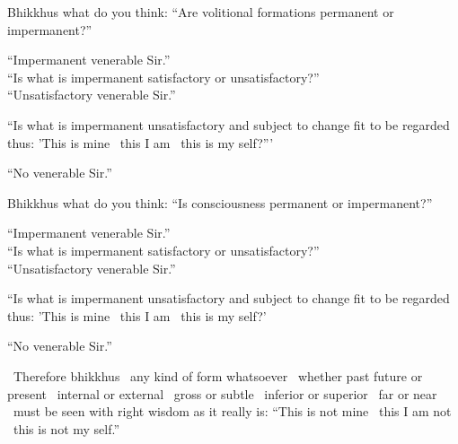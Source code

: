 \begin{english-only-nohang}
  \begin{english-only-hang}
    Bhikkhus what do you think: ``Are volitional formations permanent or impermanent?''
  \end{english-only-hang}

  ``Impermanent venerable Sir.''\\

  ``Is what is impermanent satisfactory or unsatisfactory?'' \\

  ``Unsatisfactory venerable Sir.''\\

  \begin{english-hangtogether}
    ``Is what is impermanent unsatisfactory and subject to change fit to be regarded thus: 'This is mine \breathmark\ this I am \breathmark\ this is my self?'''
  \end{english-hangtogether}

  ``No venerable Sir.''
\end{english-only-nohang}

\begin{english-only-nohang}
  \begin{english-only-hang}
    Bhikkhus what do you think: ``Is consciousness permanent or impermanent?''
  \end{english-only-hang}

  ``Impermanent venerable Sir.''\\

  ``Is what is impermanent satisfactory or unsatisfactory?''\\

  ``Unsatisfactory venerable Sir.''\\

  \begin{english-hangtogether}
    ``Is what is impermanent unsatisfactory and subject to change fit to be regarded thus: 'This is mine \breathmark\ this I am \breathmark\ this is my self?'
  \end{english-hangtogether}

  ``No venerable Sir.''
\end{english-only-nohang}

\begin{english-only-hang}
  \anglebracketleft\ \hspace{-0.5mm}Therefore bhikkhus \hspace{-0.5mm}\anglebracketright\ any kind of form whatsoever \breathmark\ whether past future or present \breathmark\ internal or external \breathmark\ gross or subtle \breathmark\ inferior or superior \breathmark\ far or near \breathmark\ must be seen with right wisdom as it really is: ``This is not mine \breathmark\ this I am not \breathmark\ this is not my self.''
\end{english-only-hang}

